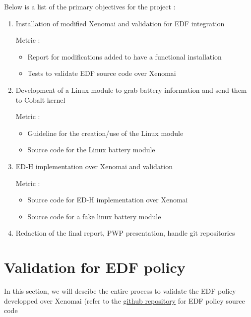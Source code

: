 \documentclass[12pt,hidelinks]{article}
\begin{document}
{    Below is a list of the primary objectives for the project :
    \begin{enumerate}
        \item Installation of modified Xenomai and validation for EDF integration

        Metric : \begin{itemize}
            \item Report for modifications added to have a functional installation
            \item Tests to validate EDF source code over Xenomai
        \end{itemize}
        
        \item Development of  a Linux module to grab battery information and send them to Cobalt kernel

        Metric : \begin{itemize}
            \item Guideline for the creation/use of the Linux module
            \item Source code for the Linux battery module​
        \end{itemize}

        \item ED-H implementation over Xenomai and validation 

        Metric : \begin{itemize}
            \item Source code for ED-H implementation over Xenomai 
            \item Source code for a fake linux battery module
        \end{itemize}
        
        \item Redaction of the final report, PWP presentation, handle git repositories 

    \end{enumerate}
    
    
	\vspace{-1.5mm}
\newpage
\section{Validation for EDF policy}
\vspace{4cm}

In this section, we will descibe the entire process to validate the EDF policy developped over Xenomai (refer to the \href{https://github.com/skyultime/Xenomai-EDH/commit/37aed321405df633a39f17e16ad50599cadb9ed9}{github repository} for EDF policy source code 

}
\end{document}
